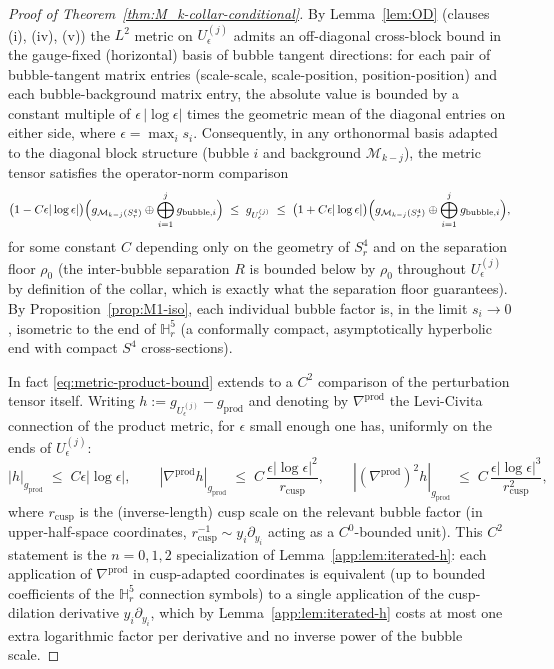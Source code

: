 \documentclass[11pt,letterpaper]{article}
\theoremstyle{definition}
\newcommand{\bbH}{\mathbb{H}}
\newcommand{\cM}{\mathcal{M}}
\begin{document}
\begin{proof}[Proof of Theorem~\ref{thm:M_k-collar-conditional}]
By Lemma~\ref{lem:OD} (clauses (i), (iv), (v)) the $L^2$ metric on $U_\epsilon^{(j)}$ admits an off-diagonal cross-block bound in the gauge-fixed (horizontal) basis of bubble tangent directions: for each pair of bubble-tangent matrix entries (scale-scale, scale-position, position-position) and each bubble-background matrix entry, the absolute value is bounded by a constant multiple of $\epsilon\,|\log\epsilon|$ times the geometric mean of the diagonal entries on either side, where $\epsilon = \max_i s_i$. Consequently, in any orthonormal basis adapted to the diagonal block structure (bubble $i$ and background $\cM_{k-j}$), the metric tensor satisfies the operator-norm comparison
\begin{equation}\label{eq:metric-product-bound}
\bigl(1 - C\epsilon|\log\epsilon|\bigr)\Bigl(g_{\cM_{k-j}(S^4_r)} \oplus \bigoplus_{i=1}^j g_{\mathrm{bubble},i}\Bigr) \;\le\; g_{U_\epsilon^{(j)}} \;\le\; \bigl(1 + C\epsilon|\log\epsilon|\bigr)\Bigl(g_{\cM_{k-j}(S^4_r)} \oplus \bigoplus_{i=1}^j g_{\mathrm{bubble},i}\Bigr),
\end{equation}
for some constant $C$ depending only on the geometry of $S^4_r$ and on the separation floor $\rho_0$ (the inter-bubble separation $R$ is bounded below by $\rho_0$ throughout $U_\epsilon^{(j)}$ by definition of the collar, which is exactly what the separation floor guarantees). By Proposition~\ref{prop:M1-iso}, each individual bubble factor is, in the limit $s_i \to 0$, isometric to the end of $\bbH^5_r$ (a conformally compact, asymptotically hyperbolic end with compact $S^4$ cross-sections).

In fact \eqref{eq:metric-product-bound} extends to a $C^2$ comparison of the perturbation tensor itself. Writing $h := g_{U_\epsilon^{(j)}} - g_{\mathrm{prod}}$ and denoting by $\nabla^{\mathrm{prod}}$ the Levi-Civita connection of the product metric, for $\epsilon$ small enough one has, uniformly on the ends of $U_\epsilon^{(j)}$:
\begin{equation}\label{eq:metric-product-bound-C2}
|h|_{g_{\mathrm{prod}}} \;\le\; C\epsilon|\log\epsilon|, \qquad
|\nabla^{\mathrm{prod}} h|_{g_{\mathrm{prod}}} \;\le\; C\,\frac{\epsilon|\log\epsilon|^{2}}{r_{\mathrm{cusp}}}, \qquad
|(\nabla^{\mathrm{prod}})^{2} h|_{g_{\mathrm{prod}}} \;\le\; C\,\frac{\epsilon|\log\epsilon|^{3}}{r_{\mathrm{cusp}}^{2}},
\end{equation}
where $r_{\mathrm{cusp}}$ is the (inverse-length) cusp scale on the relevant bubble factor (in upper-half-space coordinates, $r_{\mathrm{cusp}}^{-1} \sim y_i\partial_{y_i}$ acting as a $C^0$-bounded unit). This $C^2$ statement is the $n = 0, 1, 2$ specialization of Lemma~\ref{app:lem:iterated-h}: each application of $\nabla^{\mathrm{prod}}$ in cusp-adapted coordinates is equivalent (up to bounded coefficients of the $\bbH^5_r$ connection symbols) to a single application of the cusp-dilation derivative $y_i\partial_{y_i}$, which by Lemma~\ref{app:lem:iterated-h} costs at most one extra logarithmic factor per derivative and no inverse power of the bubble scale.


\end{proof}
\end{document}
